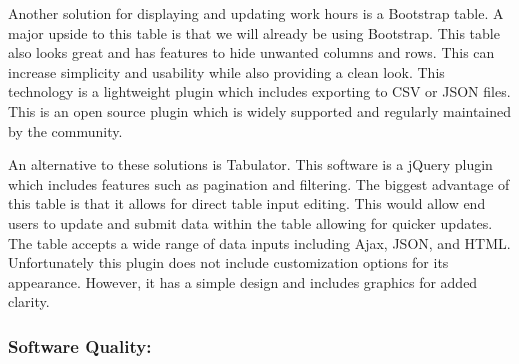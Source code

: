 \documentclass[letterpaper,10pt,titlepage,journal,compsoc,draftclsnofoot,onecolumn]{IEEEtran}
\newcommand\tab[1][1cm]{\hspace*{#1}}
\begin{document}

\tab Another solution for displaying and updating work hours is a Bootstrap table. A major upside to this table is that we will already be using Bootstrap. This table also looks great and has features to hide unwanted columns and rows. This can increase simplicity and usability while also providing a clean look. This technology is a lightweight plugin which includes exporting to CSV or JSON files. This is an open source plugin which is widely supported and regularly maintained by the community. \newline


\tab An alternative to these solutions is Tabulator. This software is a jQuery plugin which includes features such as pagination and filtering. The biggest advantage of this table is that it allows for direct table input editing. This would allow end users to update and submit data within the table allowing for quicker updates. The table accepts a wide range of data inputs including Ajax, JSON, and HTML. Unfortunately this plugin does not include customization options for its appearance. However, it has a simple design and includes graphics for added clarity. \newline


\subsubsection{Software Quality:}
\end{document}
